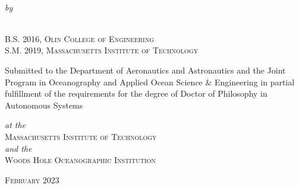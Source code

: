 \begin{titlepage}
  \begin{center}
    \begin{Large}
      \@title
    \end{Large}\\ [-0.1em]
    \emph{\footnotesize by}\\ [-0.1em]
    \begin{singlespace}
    {\large \@author} \\
    {\small B.S. 2016, \textsc{Olin College of Engineering}} \\ 
    {\small S.M. 2019, \textsc{Massachusetts Institute of Technology}} \\ [-0.25em]
    \end{singlespace}
    \begin{singlespace}
    {Submitted to the Department of Aeronautics and Astronautics and the Joint Program in Oceanography and Applied Ocean Science \& Engineering in partial fulfillment of the requirements for the degree of Doctor of Philosophy in Autonomous Systems} \\ [-0.5em]
    \end{singlespace}
    \begin{singlespace}
    \emph{\footnotesize at the}\\ 
    {\textsc{Massachusetts Institute of Technology}} \\ 
    \emph{\footnotesize and the}\\ 
    {\textsc{Woods Hole Oceanographic Institution}} \\ [-0.25em]
    \end{singlespace}
    \begin{singlespace}
        {\textsc{February} 2023} \\ [-0.25em]
    \end{singlespace}
  

\end{center}
\end{titlepage}
